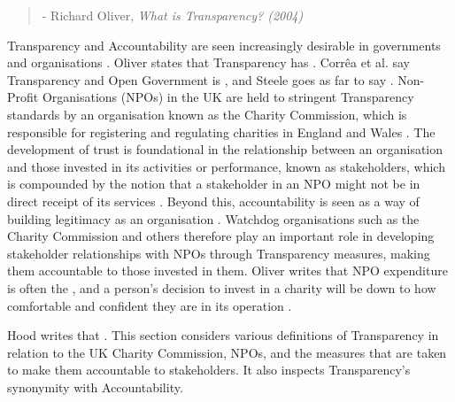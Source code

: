 %
\begin{quote}
 - Richard Oliver, \textit{What is Transparency? (2004)}
\end{quote}


Transparency and Accountability are seen increasingly desirable in governments and organisations \cite{hood_accountability_2010, oliver_what_2004, heald_fiscal_2003}. Oliver states that Transparency has  \cite{oliver_what_2004}.  Corr\^ea et al. say Transparency and Open Government is  \cite{correa_really_2014}, and Steele goes as far to say  \cite{steele_open-source_2012}.
%
Non-Profit Organisations (NPOs) in the UK are held to stringent Transparency standards by an organisation known as the Charity Commission, which is responsible for registering and regulating charities in England and Wales  \cite{hm_government_charity_????}. The development of trust is foundational in the relationship between an organisation and those invested in its activities or performance, known as stakeholders, which is compounded by the notion that a stakeholder in an NPO might not be in direct receipt of its services \cite{macmillan_relationship_2005, krashinsky_stakeholder_1997}. Beyond this, accountability is seen as a way of building legitimacy as an organisation \cite{anheier_accountability_2009}. Watchdog organisations such as the Charity Commission and others therefore play an important role in developing stakeholder relationships with NPOs through Transparency measures, making them accountable to those invested in them. Oliver writes that NPO expenditure is often the , and a person's decision to invest in a charity will be down to how comfortable and confident they are in its operation \cite{oliver_what_2004}.


Hood writes that  \cite{hood_transparency_2006-1}. This section considers various definitions of Transparency in relation to the UK Charity Commission, NPOs, and the measures that are taken to make them accountable to stakeholders. It also inspects Transparency's synonymity with Accountability.

